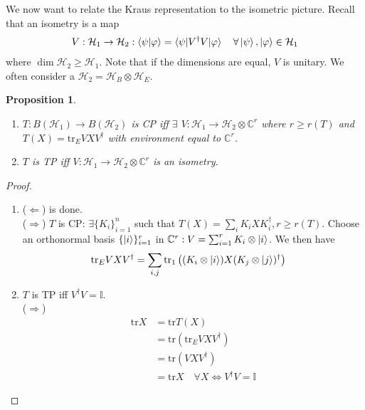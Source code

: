 \documentclass[10pt,oneside,longbibliography]{report}
\newtheorem{proposition}{Proposition}[section]
\begin{document}
We now want to relate the Kraus representation to the isometric picture. Recall that an isometry is a map
\begin{align}
    V: \mathcal{H}_1 \rightarrow \mathcal{H}_2 : \braket{\psi|\varphi} = \braket{\psi|V^{\dagger}V|\varphi} \quad \forall \ket{\psi}, \ket{\varphi} \in \mathcal{H}_1
\end{align}
where $\dim \mathcal{H}_2 \geq \mathcal{H}_1$. Note that if the dimensions are equal, $V$ is unitary. We often consider a $\mathcal{H}_2 = \mathcal{H}_B \otimes \mathcal{H}_E$. 

\begin{proposition}
\begin{enumerate}
    \item $T: B(\mathcal{H}_1)\rightarrow B(\mathcal{H}_2)$  is CP iff $\exists$ $V: \mathcal{H}_1 \rightarrow \mathcal{H}_2 \otimes \mathbb{C}^r$ where $r \geq r(T)$ and $T(X) =\text{tr}_E VXV^{\dagger}$ with environment equal to $\mathbb{C}^r$.
    \item $T$ is TP iff $V: \mathcal{H}_1\rightarrow \mathcal{H}_2 \otimes \mathbb{C}^r$ is an isometry.
\end{enumerate}
\end{proposition}

\begin{tcolorbox}[colframe=black,breakable, colback=black!5, arc=0pt, outer arc=0pt,boxrule=0.5pt]
\begin{proof}
\begin{enumerate}
    \item ($\Leftarrow$) is done. \\
    ($\Rightarrow$) $T$ is CP: $\exists \{K_i\}_{i=1}^n$ such that $T(X) = \sum_i K_i X K_i^{\dagger}, r \geq r(T)$. Choose an orthonormal basis $\{\ket{i}\}_{i=1}^r$ in $\mathbb{C}^r: V=\sum_{i=1}^r K_i \otimes \ket{i}$. We then have 
    \begin{align}
        \text{tr}_E VXV^{\dagger} &= \sum_{i,j}\text{tr}_1 \left((K_i \otimes \ket{i})X(K_j \otimes \ket{j})^{\dagger}\right)
    \end{align}
    
    \item $T$ is TP iff $V^{\dagger}V=\mathbb{I}$. \\
    ($\Rightarrow$) 
    \begin{align}
         \text{tr}X &= \text{tr}T(X) \\
         &= \text{tr}\left(\text{tr}_E VXV^{\dagger}\right) \\
         &= \text{tr}(VXV^{\dagger})\\
         &=\text{tr} X \quad \forall X \Leftrightarrow V^{\dagger}V=\mathbb{I}
    \end{align}
\end{enumerate}
\end{proof}
\end{tcolorbox}
\end{document}
